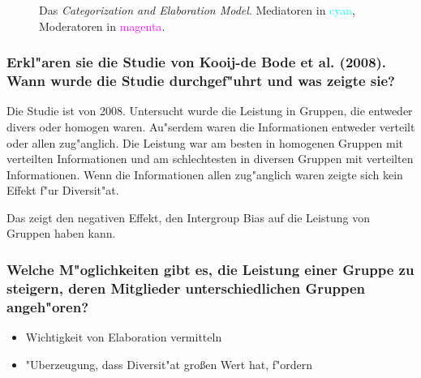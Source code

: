 \begin{figure}[<+htpb+>]
\begin{center}
        \end{center}
        \caption{Das \emph{Categorization and Elaboration Model}. Mediatoren in \textcolor{cyan}{cyan}, Moderatoren in \textcolor{magenta}{magenta}.}
        \label{fig:catelab}
\end{figure}

\subsubsection{Erkl"aren sie die Studie von Kooij-de Bode et al. (2008). Wann wurde die Studie durchgef"uhrt und was zeigte sie?}
Die Studie ist von 2008. Untersucht wurde die Leistung in Gruppen, die entweder divers oder homogen waren. Au"serdem waren die Informationen entweder verteilt oder allen zug"anglich. Die Leistung war am besten in homogenen Gruppen mit verteilten Informationen und am schlechtesten in diversen Gruppen mit verteilten Informationen. Wenn die Informationen allen zug"anglich waren zeigte sich kein Effekt f"ur Diversit"at.

Das zeigt den negativen Effekt, den Intergroup Bias auf die Leistung von Gruppen haben kann.

\subsubsection{Welche M"oglichkeiten gibt es, die Leistung einer Gruppe zu steigern, deren Mitglieder unterschiedlichen Gruppen angeh"oren?}
\begin{itemize}
        \item Wichtigkeit von Elaboration vermitteln
        \item "Uberzeugung, dass Diversit"at großen Wert hat, f"ordern
\end{itemize}
